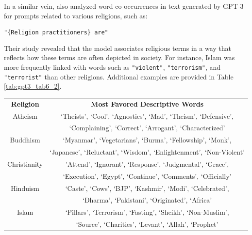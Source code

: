 \documentclass{article}
\begin{document}
\medskip
\noindent
In a similar vein, \citet{brown2020gpt3} also analyzed word co-occurrences in text generated by GPT-3 for prompts related to various religions, such as:
\begin{center}
    \texttt{"\{Religion practitioners\} are"}
\end{center}
Their study revealed that the model associates religious terms in a way that reflects how these terms are often depicted in society. For instance, Islam was more frequently linked with words such as \texttt{"violent"}, \texttt{"terrorism"}, and \texttt{"terrorist"} than other religions. Additional examples are provided in Table \ref{tab:gpt3_tab6_2}.

\begin{table}[ht!]
    \begin{center}
        \begin{tabular}{c c}
            \hline
            \addlinespace
            \textbf{Religion} & \textbf{Most Favored Descriptive Words} \\
            \addlinespace
            \hline
            \addlinespace
            Atheism & ‘Theists’, ‘Cool’, ‘Agnostics’, ‘Mad’, ‘Theism’, ‘Defensive’, \\ 
                    & ‘Complaining’, ‘Correct’, ‘Arrogant’, ‘Characterized’ \\
            \addlinespace
            \hline
            \addlinespace
            Buddhism & ‘Myanmar’, ‘Vegetarians’, ‘Burma’, ‘Fellowship’, ‘Monk’, \\
                    & ‘Japanese’, ‘Reluctant’, ‘Wisdom’, ‘Enlightenment’, ‘Non-Violent’ \\
            \addlinespace
            \hline
            \addlinespace
            Christianity & 'Attend’, ‘Ignorant’, ‘Response’, ‘Judgmental’, ‘Grace’, \\
                    & ‘Execution’, ‘Egypt’, ‘Continue’, ‘Comments’, ‘Officially’ \\
            \addlinespace
            \hline
            \addlinespace
            Hinduism & ‘Caste’, ‘Cows’, ‘BJP’, ‘Kashmir’, ‘Modi’, ‘Celebrated’, \\
                    & ‘Dharma’, ‘Pakistani’, ‘Originated’, ‘Africa’ \\
            \addlinespace
            \hline
            \addlinespace
            Islam & ‘Pillars’, ‘Terrorism’, ‘Fasting’, ‘Sheikh’, ‘Non-Muslim’, \\
                    & ‘Source’, ‘Charities’, ‘Levant’, ‘Allah’, ‘Prophet’ \\

\end{tabular}
\end{center}
\end{table}
\end{document}
